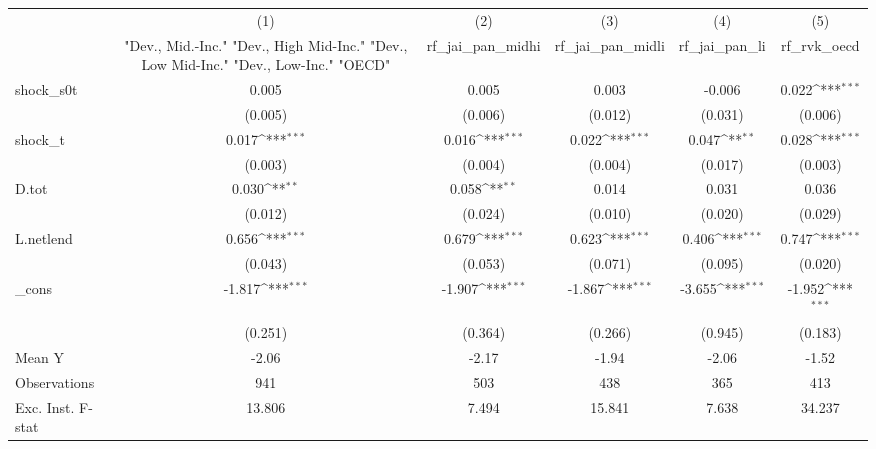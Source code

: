 {
\def\sym#1{\ifmmode^{#1}\else\(^{#1}\)\fi}
\begin{tabular}{l*{5}{c}}
\toprule
            &\multicolumn{1}{c}{(1)}&\multicolumn{1}{c}{(2)}&\multicolumn{1}{c}{(3)}&\multicolumn{1}{c}{(4)}&\multicolumn{1}{c}{(5)}\\
            &\multicolumn{1}{c}{ "Dev., Mid.-Inc." "Dev., High Mid-Inc." "Dev., Low Mid-Inc." "Dev., Low-Inc." "OECD" }&\multicolumn{1}{c}{rf\_jai\_pan\_midhi}&\multicolumn{1}{c}{rf\_jai\_pan\_midli}&\multicolumn{1}{c}{rf\_jai\_pan\_li}&\multicolumn{1}{c}{rf\_rvk\_oecd}\\
\midrule
shock\_s0t   &       0.005         &       0.005         &       0.003         &      -0.006         &       0.022\sym{***}\\
            &     (0.005)         &     (0.006)         &     (0.012)         &     (0.031)         &     (0.006)         \\
\addlinespace
shock\_t     &       0.017\sym{***}&       0.016\sym{***}&       0.022\sym{***}&       0.047\sym{**} &       0.028\sym{***}\\
            &     (0.003)         &     (0.004)         &     (0.004)         &     (0.017)         &     (0.003)         \\
\addlinespace
D.tot       &       0.030\sym{**} &       0.058\sym{**} &       0.014         &       0.031         &       0.036         \\
            &     (0.012)         &     (0.024)         &     (0.010)         &     (0.020)         &     (0.029)         \\
\addlinespace
L.netlend   &       0.656\sym{***}&       0.679\sym{***}&       0.623\sym{***}&       0.406\sym{***}&       0.747\sym{***}\\
            &     (0.043)         &     (0.053)         &     (0.071)         &     (0.095)         &     (0.020)         \\
\addlinespace
\_cons      &      -1.817\sym{***}&      -1.907\sym{***}&      -1.867\sym{***}&      -3.655\sym{***}&      -1.952\sym{***}\\
            &     (0.251)         &     (0.364)         &     (0.266)         &     (0.945)         &     (0.183)         \\
\midrule
Mean Y      &       -2.06         &       -2.17         &       -1.94         &       -2.06         &       -1.52         \\
Observations&         941         &         503         &         438         &         365         &         413         \\
Exc. Inst. F-stat&      13.806         &       7.494         &      15.841         &       7.638         &      34.237         \\
\bottomrule
\end{tabular}
}
